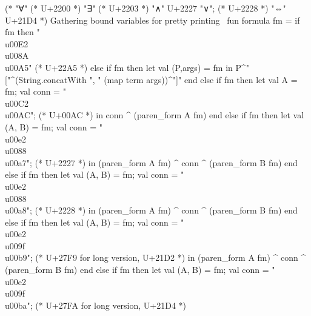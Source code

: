 \nwenddocs{}\endmoddef\nwstartdeflinemarkup{}\nwenddeflinemarkup
(* "∀" (* U+2200 *)
   "∃" (* U+2203 *)
"∧" U+2227
"∨"; (* U+2228 *)
"⇔" U+21D4
 *)
\LA{}Gathering bound variables for pretty printing~{\nwtagstyle{}}\RA{}
fun formula fm =
  if  fm
  then "\\u00E2\\u008A\\u00A5" (* U+22A5 *)
  else if  fm
  then let val (P,args) =  fm
       in P^"["^(String.concatWith ", " (map term args))^"]" end
  else if  fm
  then let val A =  fm;
           val conn = "\\u00C2\\u00AC"; (* U+00AC *)
       in conn ^ (paren_form A fm) end
  else if  fm
  then let val (A, B) =  fm;
           val conn = "\\u00e2\\u0088\\u00a7"; (* U+2227 *)
       in (paren_form A fm) ^ conn ^ (paren_form B fm) end
  else if  fm
  then let val (A, B) =  fm;
           val conn = "\\u00e2\\u0088\\u00a8"; (* U+2228 *)
       in (paren_form A fm) ^ conn ^ (paren_form B fm) end
  else if  fm
  then let val (A, B) =  fm;
           val conn = "\\u00e2\\u009f\\u00b9"; (* U+27F9 for long version, U+21D2 *)
       in (paren_form A fm) ^ conn ^ (paren_form B fm) end
  else if  fm
  then let val (A, B) =  fm;
           val conn = "\\u00e2\\u009f\\u00ba"; (* U+27FA for long version, U+21D4 *)
